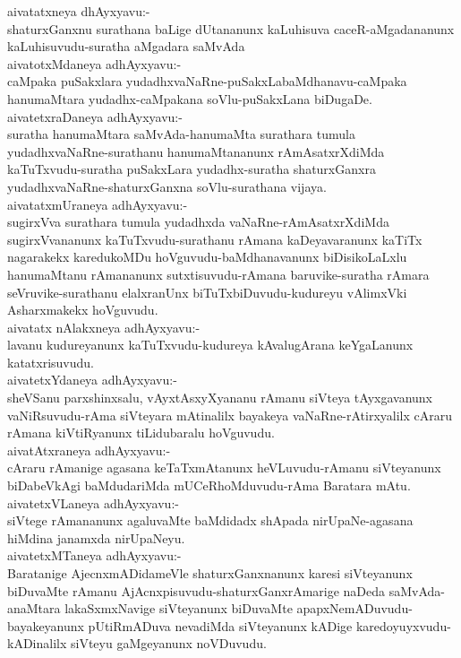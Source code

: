 \documentclass{article}
\begin{document}
aivatatxneya dhAyxyavu:-\\
shaturxGanxnu surathana baLige dUtananunx kaLuhisuva caceR-aMgadananunx kaLuhisuvudu-suratha aMgadara saMvAda\\
aivatotxMdaneya adhAyxyavu:-\\
caMpaka puSakxlara yudadhxvaNaRne-puSakxLabaMdhanavu-caMpaka hanumaMtara yudadhx-caMpakana soVlu-puSakxLana biDugaDe.\\
aivatetxraDaneya adhAyxyavu:-\\
suratha hanumaMtara saMvAda-hanumaMta surathara tumula yudadhxvaNaRne-surathanu hanumaMtananunx rAmAsatxrXdiMda kaTuTxvudu-suratha puSakxLara yudadhx-suratha shaturxGanxra yudadhxvaNaRne-shaturxGanxna soVlu-surathana vijaya.\\
aivatatxmUraneya adhAyxyavu:-\\
sugirxVva surathara tumula yudadhxda vaNaRne-rAmAsatxrXdiMda sugirxVvananunx kaTuTxvudu-surathanu rAmana kaDeyavaranunx kaTiTx nagarakekx karedukoMDu hoVguvudu-baMdhanavanunx biDisikoLaLxlu hanumaMtanu rAmananunx sutxtisuvudu-rAmana baruvike-suratha rAmara seVruvike-surathanu elalxranUnx biTuTxbiDuvudu-kudureyu vAlimxVki Asharxmakekx hoVguvudu.\\
aivatatx nAlakxneya adhAyxyavu:-\\
lavanu kudureyanunx kaTuTxvudu-kudureya kAvalugArana keYgaLanunx katatxrisuvudu.\\
aivatetxYdaneya adhAyxyavu:-\\
sheVSanu parxshinxsalu, vAyxtAsxyXyananu rAmanu siVteya tAyxgavanunx vaNiRsuvudu-rAma siVteyara mAtinalilx bayakeya vaNaRne-rAtirxyalilx cAraru rAmana kiVtiRyanunx tiLidubaralu hoVguvudu.\\
aivatAtxraneya adhAyxyavu:-\\
cAraru rAmanige agasana keTaTxmAtanunx heVLuvudu-rAmanu siVteyanunx biDabeVkAgi baMdudariMda mUCeRhoMduvudu-rAma Baratara mAtu.\\
aivatetxVLaneya adhAyxyavu:-\\
siVtege rAmananunx agaluvaMte baMdidadx shApada nirUpaNe-agasana hiMdina janamxda nirUpaNeyu.\\
aivatetxMTaneya adhAyxyavu:-\\
Baratanige AjecnxmADidameVle shaturxGanxnanunx karesi siVteyanunx biDuvaMte rAmanu AjAcnxpisuvudu-shaturxGanxrAmarige naDeda saMvAda-anaMtara lakaSxmxNavige siVteyanunx biDuvaMte apapxNemADuvudu-bayakeyanunx pUtiRmADuva nevadiMda siVteyanunx kADige karedoyuyxvudu-kADinalilx siVteyu gaMgeyanunx noVDuvudu.\\
\end{document}
